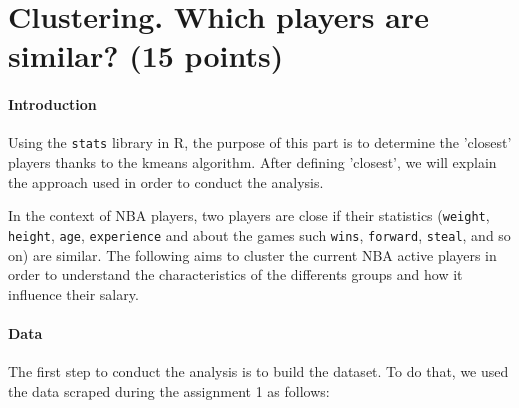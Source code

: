 \section*{Clustering. Which players are similar? (15 points)}
\label{subsec:3Q1}

\paragraph{Introduction}Using the \texttt{stats} library in R, the purpose of this part is to determine the 'closest' players thanks to the kmeans algorithm. After defining 'closest', we will explain the approach used in order to conduct the analysis.

In the context of NBA players, two players are close if their statistics (\texttt{weight}, \texttt{height}, \texttt{age}, \texttt{experience} and about the games such \texttt{wins}, \texttt{forward}, \texttt{steal}, and so on) are similar. The following aims to cluster the current NBA active players in order to understand the characteristics of the differents groups and how it influence their salary.

\paragraph{Data}The first step to conduct the analysis is to build the dataset. To do that, we used the data scraped during the assignment 1 as follows:

